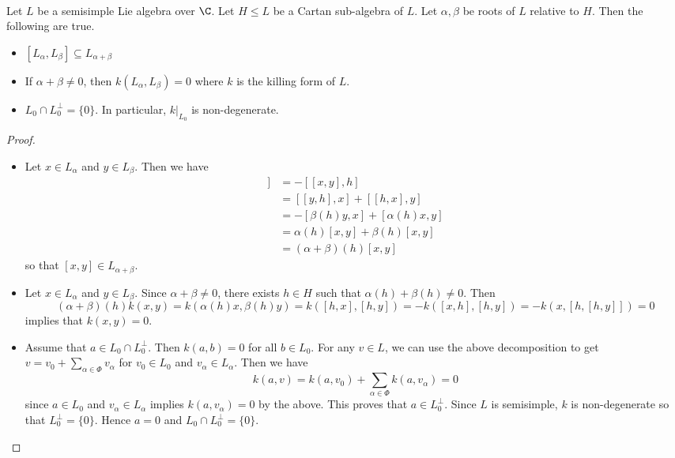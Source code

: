 \documentclass[a4paper]{article}
\begin{document}
\begin{prp}{}{} \\Let $L$ be a semisimple Lie algebra over $\C$. Let $H\leq L$ be a Cartan sub-algebra of $L$. Let $\alpha,\beta$ be roots of $L$ relative to $H$. Then the following are true. 
\begin{itemize}
\item $[L_\alpha,L_\beta]\subseteq L_{\alpha+\beta}$
\item If $\alpha+\beta\neq 0$, then $k(L_\alpha,L_\beta)=0$ where $k$ is the killing form of $L$. 
\item $L_0\cap L_0^\perp=\{0\}$. In particular, $k|_{L_0}$ is non-degenerate. 
\end{itemize} 
\begin{proof}~\\
\begin{itemize}
\item Let $x\in L_\alpha$ and $y\in L_\beta$. Then we have 
\begin{align*}
[h,[x,y]]&=-[[x,y],h]\\
&=[[y,h],x]+[[h,x],y]\\
&=-[\beta(h)y,x]+[\alpha(h)x,y]\\
&=\alpha(h)[x,y]+\beta(h)[x,y]\\
&=(\alpha+\beta)(h)[x,y]
\end{align*}
so that $[x,y]\in L_{\alpha+\beta}$. 
\item Let $x\in L_\alpha$ and $y\in L_\beta$. Since $\alpha+\beta\neq 0$, there exists $h\in H$ such that $\alpha(h)+\beta(h)\neq 0$. Then $$(\alpha+\beta)(h)k(x,y)=k(\alpha(h)x,\beta(h)y)=k([h,x],[h,y])=-k([x,h],[h,y])=-k(x,[h,[h,y]])=0$$ implies that $k(x,y)=0$. 
\item Assume that $a\in L_0\cap L_0^\perp$. Then $k(a,b)=0$ for all $b\in L_0$. For any $v\in L$, we can use the above decomposition to get $v=v_0+\sum_{\alpha\in\Phi}v_\alpha$ for $v_0\in L_0$ and $v_\alpha\in L_\alpha$. Then we have $$k(a,v)=k(a,v_0)+\sum_{\alpha\in\Phi}k(a,v_\alpha)=0$$ since $a\in L_0$ and $v_\alpha\in L_\alpha$ implies $k(a,v_\alpha)=0$ by the above. This proves that $a\in L_0^\perp$. Since $L$ is semisimple, $k$ is non-degenerate so that $L_0^\perp=\{0\}$. Hence $a=0$ and $L_0\cap L_0^\perp=\{0\}$. 
\end{itemize}
\end{proof}
\end{prp}
\end{document}

